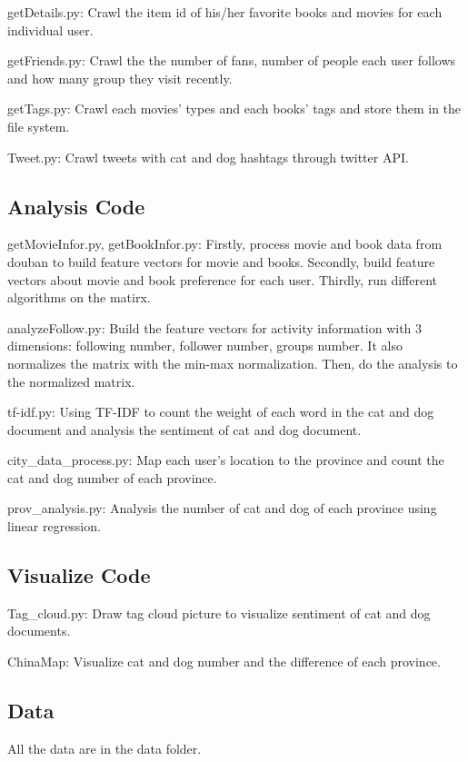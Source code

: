 \documentclass[12pt]{article}
\begin{document}
getDetails.py: Crawl the item id of his/her favorite books and movies for each individual user.

getFriends.py: Crawl the the number of fans, number of people each user follows and how many group they visit recently.

getTags.py: Crawl each movies' types and each books' tags and store them in the file system.

Tweet.py: Crawl tweets with cat and dog hashtags through twitter API.

\subsection{Analysis Code}

getMovieInfor.py, getBookInfor.py: Firstly, process movie and book data from douban to build feature vectors for movie and books. Secondly, build feature vectors about movie and book preference for each user. Thirdly, run different algorithms on the matirx.

analyzeFollow.py: Build the feature vectors for activity information with 3 dimensions: following number, follower number, groups number. It also normalizes the matrix with the min-max normalization. Then, do the analysis to the normalized matrix.

tf-idf.py: Using TF-IDF to count the weight of each word in the cat and dog document and analysis the sentiment of cat and dog document.

city\_data\_process.py: Map each user's location to the province and count the cat and dog number of each province.

prov\_analysis.py: Analysis the number of cat and dog of each province using linear regression.

\subsection{Visualize Code}

Tag\_cloud.py: Draw tag cloud picture to visualize sentiment of cat and dog documents.

ChinaMap: Visualize cat and dog number and the difference of each province.

\subsection{Data}

All the data are in the data folder.
\end{document}
